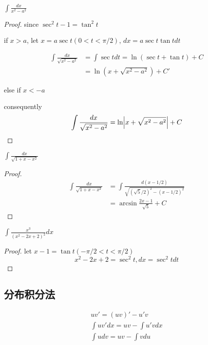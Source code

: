 \documentclass[11pt]{article}
\begin{document}
\begin{proposition}[]
\(\int\frac{dx}{x^2-a^2}\)
\end{proposition}

\begin{proof}
since \(\sec^2t-1=\tan^2t\)

if \(x>a\), let \(x=a\sec t(0<t<\pi/2)\), \(dx=a\sec t\tan tdt\)

\begin{align*}
\int\frac{dx}{\sqrt{x^2-a^2}}&=\int\sec tdt=\ln(\sec t+\tan t)+C\\
&=\ln(x+\sqrt{x^2-a^2})+C'
\end{align*}

else if \(x<-a\)

consequently
\begin{equation*}
\int\frac{dx}{\sqrt{x^2-a^2}}=\ln\abs{x+\sqrt{x^2-a^2}}+C
\end{equation*}
\end{proof}

\begin{proposition}[]
\(\int\frac{dx}{\sqrt{1+x-x^2}}\)
\end{proposition}

\begin{proof}
    \begin{align*}
\int\frac{dx}{\sqrt{1+x-x^2}}&=\int\frac{d(x-1/2)}{\sqrt{(\sqrt{5}/2)^2-(x-1/2)^2}}\\
&=\arcsin\frac{2x-1}{\sqrt{5}}+C
\end{align*}
\end{proof}


\begin{proposition}[]
\(\int\frac{x^3}{(x^2-2x+2)^2}dx\)
\end{proposition}

\begin{proof}
let \(x-1=\tan t(-\pi/2<t<\pi/2)\)
\begin{equation*}
x^2-2x+2=\sec^2t, dx=\sec^2tdt
\end{equation*}
\end{proof}
\subsection{分布积分法}
\label{sec:orgea6b1be}
\begin{gather*}
uv'=(uv)'-u'v\\
\int uv'dx=uv-\int u'vdx\\
\int udv=uv-\int vdu
\end{gather*}
\end{document}

